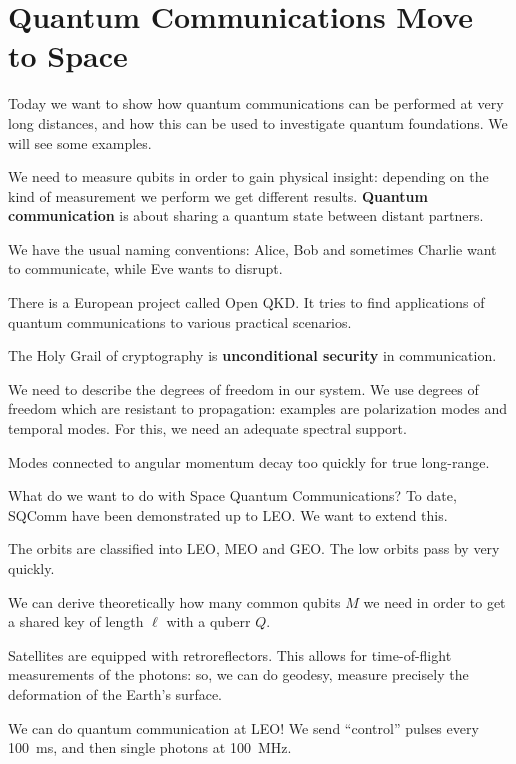 \documentclass[main.tex]{subfiles}
\begin{document}
\section{Quantum Communications Move to Space}


Today we want to show how quantum communications can be performed at very long distances, and how this can be used to investigate quantum foundations. 
We will see some examples.

We need to measure qubits in order to gain physical insight: depending on the kind of measurement we perform we get different results. \textbf{Quantum communication} is about sharing a quantum state between distant partners. 

We have the usual naming conventions: Alice, Bob and sometimes Charlie want to communicate, while Eve wants to disrupt. 

There is a European project called Open QKD. 
It tries to find applications of quantum communications to various practical scenarios.

The Holy Grail of cryptography is \textbf{unconditional security} in communication. 

We need to describe the degrees of freedom in our system. 
We use degrees of freedom which are resistant to propagation: examples are polarization modes and temporal modes. For this, we need an adequate spectral support.

Modes connected to angular momentum decay too quickly for true long-range. 

What do we want to do with Space Quantum Communications? 
To date, SQComm have been demonstrated up to LEO. We want to extend this. 

The orbits are classified into LEO, MEO and GEO. 
The low orbits pass by very quickly. 

We can derive theoretically how many common qubits \(M\) we need in order to get a shared key of length \(\ell\) with a quberr \(Q\).

Satellites are equipped with retroreflectors. 
This allows for time-of-flight measurements of the photons: so, we can do geodesy, measure precisely the deformation of the Earth's surface. 

We can do quantum communication at LEO! We send ``control'' pulses every \SI{100}{ms}, and then single photons at \SI{100}{MHz}.
\end{document}
